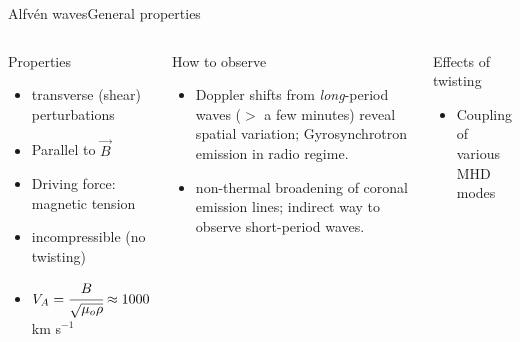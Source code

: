 \documentclass[11pt,table]{beamer}
\begin{document}
\begin{frame}{Alfv\'en waves}{General properties}
    \begin{columns}
        \begin{block}{Properties}
            \begin{itemize}
                \item transverse (shear) perturbations
                \item Parallel to $\vec{B}$
                \item Driving force: magnetic tension
                \item incompressible (no twisting)
                \item $V_{A} = \cfrac{B}{\sqrt{\mu_{o}\rho}} \approx 1000$
                    km s$^{-1}$
            \end{itemize}
        \end{block}
        \begin{block}{How to observe}
            \begin{itemize}
                \item Doppler shifts from \emph{long}-period waves
                    ($>$ a few minutes) reveal spatial variation;
                    Gyrosynchrotron emission in radio regime.
                \item non-thermal broadening
                    of coronal emission lines;
                    indirect way to observe short-period waves.
            \end{itemize}
        \end{block}
        \begin{block}{Effects of twisting}
            \begin{itemize}
                \item Coupling of various MHD modes
            \end{itemize}
        \end{block}
    \end{columns}
\end{frame}%
\end{document}
